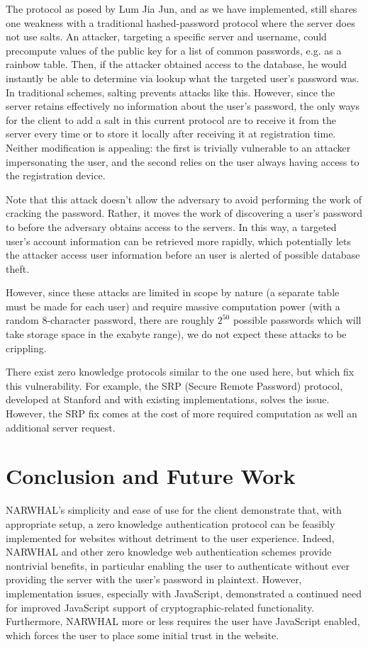 \documentclass[11pt]{article}
\begin{document}
The protocol as posed by Lum Jia Jun, and as we have implemented, still shares one weakness with a traditional hashed-password protocol where the server does not use salts.  An attacker, targeting a specific server and username, could precompute values of the public key for a list of common passwords, e.g. as a rainbow table.  Then, if the attacker obtained access to the database, he would instantly be able to determine via lookup what the targeted user's password was.  In traditional schemes, salting prevents attacks like this.  However, since the server retains effectively no information about the user's password, the only ways for the client to add a salt in this current protocol are to receive it from the server every time or to store it locally after receiving it at registration time.  Neither modification is appealing: the first is trivially vulnerable to an attacker impersonating the user, and the second relies on the user always having access to the registration device.

Note that this attack doesn't allow the adversary to avoid performing the work of cracking the password.  Rather, it moves the work of discovering a user's password to before the adversary obtains access to the servers.  In this way, a targeted user's account information can be retrieved more rapidly, which potentially lets the attacker access user information before an user is alerted of possible database theft.

However, since these attacks are limited in scope by nature (a separate table must be made for each user) and require massive computation power (with a random 8-character password, there are roughly $2^50$ possible passwords which will take storage space in the exabyte range), we do not expect these attacks to be crippling.

There exist zero knowledge protocols similar to the one used here, but which fix this vulnerability.  For example, the SRP (Secure Remote Password) protocol, developed at Stanford and with existing implementations, solves the issue.  However, the SRP fix comes at the cost of more required computation as well an additional server request. \cite{Wu} 

\section{Conclusion and Future Work}

NARWHAL's simplicity and ease of use for the client demonstrate that, with appropriate setup, a zero knowledge authentication protocol can be feasibly implemented for websites without detriment to the user experience.  Indeed, NARWHAL and other zero knowledge web authentication schemes provide nontrivial benefits, in particular enabling the user to authenticate without ever providing the server with the user's password in plaintext.  However, implementation issues, especially with JavaScript, demonstrated a continued need for improved JavaScript support of cryptographic-related functionality.  Furthermore, NARWHAL more or less requires the user have JavaScript enabled, which forces the user to place some initial trust in the website.
\end{document}
